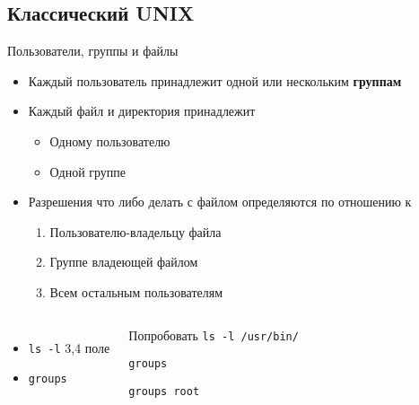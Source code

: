 \documentclass[ignorenonframetext, professionalfonts, hyperref={pdftex, unicode}]{beamer}
\begin{document}
\subsection{Классический UNIX}
\begin{frame}{Пользователи, группы и файлы}
\begin{itemize}
  \item Каждый пользователь принадлежит одной или нескольким \textbf{группам}
  \item Каждый файл и директория принадлежит
    \begin{itemize}
      \item Одному пользователю 
      \item Одной группе
    \end{itemize}
  \pause
  \item  Разрешения что либо делать с файлом определяются по отношению к
    \begin{enumerate}
      \item Пользователю-владельцу файла
      \item Группе владеющей файлом
      \item Всем остальным пользователям
    \end{enumerate}

\end{itemize}
\pause
\begin{columns}
  \begin{itemize}
    \item {\tt ls -l} 3,4 поле 
    \item {\tt groups}
   \end{itemize}
  \begin{block}{Попробовать}
    {\tt ls -l /usr/bin/}

    {\tt groups}

    {\tt groups root}
  \end{block}
\end{columns}
\end{frame}
\end{document}
